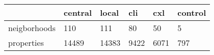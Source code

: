 \begin{table}[htbp]
\begin{tabular}{|l|l|l|l|l|l|}\hline  
 & central  & local  & cli  & cxl  & control  \\ \hline  
neigborhoods & 110 & 111 & 80 & 50 & 5 \\ \hline 
properties & 14489 & 14383 & 9422 & 6071 & 797 \\ \hline 
  \end{tabular}
\end{table}
